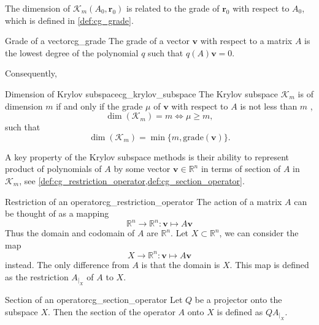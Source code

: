 The dimension of $\mathcal{K}_m(A_0, \mathbf{r}_0)$ is related to the grade of $\mathbf{r}_0$ with respect to $A_0$, which is defined in \cref{def:cg_grade}.
\begin{fancydef}{Grade of a vector}{cg_grade}
  The grade of a vector $\mathbf{v}$ with respect to a matrix $A$ is the lowest degree of the polynomial $q$ such that $q(A)\mathbf{v} = 0$.
\end{fancydef}
Consequently,
\begin{fancyth}{Dimension of Krylov subspace}{cg_krylov_subspace}
  The Krylov subspace $\mathcal{K}_m$ is of dimension $m$ if and only if the grade $\mu$ of $\mathbf{v}$ with respect to $A$ is not less than $m$ \cite[proposition 6.2]{iter_method_saad},
  \begin{equation*}
    \dim(\mathcal{K}_m) = m \iff \mu \geq m,
  \end{equation*}
  such that
  \begin{equation}
    \dim(\mathcal{K}_m) = \min \{m, \textrm{grade}(\mathbf{v})\}.
    \label{eq:cg_krylov_dimension}
  \end{equation}
\end{fancyth}

A key property of the Krylov subspace methods is their ability to represent product of polynomials of $A$ by some vector $\mathbf{v} \in \mathbb{R}^n$ in terms of section of $A$ in $\mathcal{K}_m$, see \cref{def:cg_restriction_operator,def:cg_section_operator}. 
\begin{fancydef}{Restriction of an operator}{cg_restriction_operator}
  The action of a matrix $A$ can be thought of as a mapping
  \begin{equation*}
    \mathbb{R}^n \rightarrow \mathbb{R}^n: \mathbf{v} \mapsto A \mathbf{v}
  \end{equation*}
  Thus the domain and codomain of $A$ are $\mathbb{R}^n$. Let $X \subset \mathbb{R}^n$, we can consider the map
  \begin{equation*}
    X \rightarrow \mathbb{R}^n: \mathbf{v} \mapsto A \mathbf{v}
  \end{equation*}
  instead. The only difference from $A$ is that the domain is $X$. This map is defined as the restriction $A_{\left.\right|_X}$ of $A$ to $X$.
\end{fancydef}
\begin{fancydef}{Section of an operator}{cg_section_operator}
  Let $Q$ be a projector onto the subspace $X$. Then the section of the operator $A$ onto $X$ is defined as $QA_{\left.\right|_X}$.
\end{fancydef}

